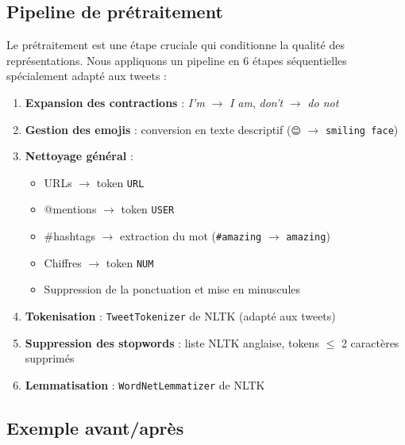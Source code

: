 \subsection{Pipeline de prétraitement}

Le prétraitement est une étape cruciale qui conditionne la qualité des représentations.
Nous appliquons un pipeline en 6 étapes séquentielles spécialement adapté aux tweets :

\begin{enumerate}[leftmargin=*,label=\textbf{Étape \arabic*.}]
  \item \textbf{Expansion des contractions} : \textit{I'm} $\rightarrow$ \textit{I am}, \textit{don't} $\rightarrow$ \textit{do not}
  \item \textbf{Gestion des emojis} : conversion en texte descriptif (\texttt{😊} $\rightarrow$ \texttt{smiling face})
  \item \textbf{Nettoyage général} :
    \begin{itemize}
      \item URLs $\rightarrow$ token \texttt{URL}
      \item @mentions $\rightarrow$ token \texttt{USER}
      \item \#hashtags $\rightarrow$ extraction du mot (\texttt{\#amazing} $\rightarrow$ \texttt{amazing})
      \item Chiffres $\rightarrow$ token \texttt{NUM}
      \item Suppression de la ponctuation et mise en minuscules
    \end{itemize}
  \item \textbf{Tokenisation} : \texttt{TweetTokenizer} de NLTK (adapté aux tweets)
  \item \textbf{Suppression des stopwords} : liste NLTK anglaise, tokens $\leq$ 2 caractères supprimés
  \item \textbf{Lemmatisation} : \texttt{WordNetLemmatizer} de NLTK
\end{enumerate}

\subsection{Exemple avant/après}


